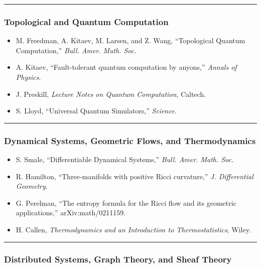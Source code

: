 \begin{center}\rule{0.5\linewidth}{0.5pt}\end{center}

\subsubsection{Topological and Quantum Computation}\label{topological-and-quantum-computation}

\begin{itemize}
\tightlist
\item
  M. Freedman, A. Kitaev, M. Larsen, and Z. Wang, ``Topological Quantum Computation,'' \emph{Bull. Amer. Math. Soc.}
\item
  A. Kitaev, ``Fault-tolerant quantum computation by anyons,'' \emph{Annals of Physics}.
\item
  J. Preskill, \emph{Lecture Notes on Quantum Computation}, Caltech.
\item
  S. Lloyd, ``Universal Quantum Simulators,'' \emph{Science}.
\end{itemize}

\begin{center}\rule{0.5\linewidth}{0.5pt}\end{center}

\subsubsection{Dynamical Systems, Geometric Flows, and Thermodynamics}\label{dynamical-systems-geometric-flows-and-thermodynamics}

\begin{itemize}
\tightlist
\item
  S. Smale, ``Differentiable Dynamical Systems,'' \emph{Bull. Amer. Math. Soc.}
\item
  R. Hamilton, ``Three-manifolds with positive Ricci curvature,'' \emph{J. Differential Geometry}.
\item
  G. Perelman, ``The entropy formula for the Ricci flow and its geometric applications,'' arXiv:math/0211159.
\item
  H. Callen, \emph{Thermodynamics and an Introduction to Thermostatistics}, Wiley.
\end{itemize}

\begin{center}\rule{0.5\linewidth}{0.5pt}\end{center}

\subsubsection{Distributed Systems, Graph Theory, and Sheaf Theory}\label{distributed-systems-graph-theory-and-sheaf-theory}

